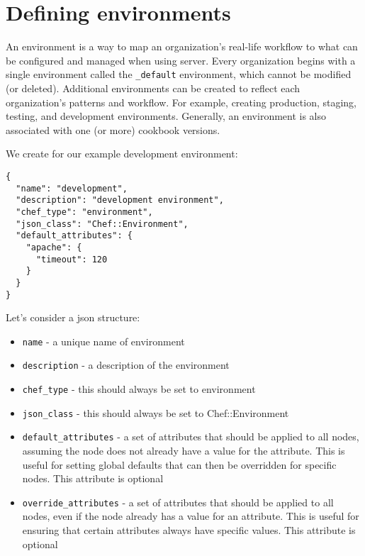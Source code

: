 \section{Defining environments}
\label{sec:solo-environment}

An environment is a way to map an organization's real-life workflow to what can be configured and managed when using server. Every organization begins with a single environment called the \lstinline!_default! environment, which cannot be modified (or deleted). Additional environments can be created to reflect each organization's patterns and workflow. For example, creating production, staging, testing, and development environments. Generally, an environment is also associated with one (or more) cookbook versions.

We create for our example development environment:

\begin{lstlisting}[label=lst:my-cloud-chef-environment1,title=my-cloud/environments/development.json]
{
  "name": "development",
  "description": "development environment",
  "chef_type": "environment",
  "json_class": "Chef::Environment",
  "default_attributes": {
    "apache": {
      "timeout": 120
    }
  }
}
\end{lstlisting}

Let's consider a json structure:

\begin{itemize}
  \item \lstinline!name! - a unique name of environment
  \item \lstinline!description! - a description of the environment
  \item \lstinline!chef_type! - this should always be set to environment
  \item \lstinline!json_class! - this should always be set to Chef::Environment
  \item \lstinline!default_attributes! - a set of attributes that should be applied to all nodes, assuming the node does not already have a value for the attribute. This is useful for setting global defaults that can then be overridden for specific nodes. This attribute is optional
  \item \lstinline!override_attributes! - a set of attributes that should be applied to all nodes, even if the node already has a value for an attribute. This is useful for ensuring that certain attributes always have specific values. This attribute is optional
\end{itemize}

